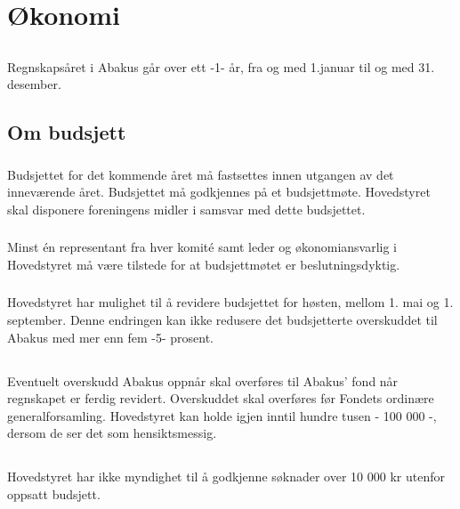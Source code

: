 \section{Økonomi}

\subsection{}
Regnskapsåret i Abakus går over ett -1- år, fra og med 1.januar til og med 31. desember.

\subsection{Om budsjett}
\subsubsection{}
Budsjettet for det kommende året må fastsettes innen utgangen av det inneværende året. Budsjettet må godkjennes på et budsjettmøte. Hovedstyret skal disponere foreningens midler i samsvar med dette budsjettet.

\subsubsection{}
Minst én representant fra hver komité samt leder og økonomiansvarlig i Hovedstyret må være tilstede for at budsjettmøtet er beslutningsdyktig.

\subsubsection{}
Hovedstyret har mulighet til å revidere budsjettet for høsten, mellom 1. mai og 1. september.
Denne endringen kan ikke redusere det budsjetterte overskuddet til Abakus med mer enn fem -5- prosent.

\subsection{}
Eventuelt overskudd Abakus oppnår skal overføres til Abakus’ fond når regnskapet er ferdig revidert.
Overskuddet skal overføres før Fondets ordinære generalforsamling.
Hovedstyret kan holde igjen inntil hundre tusen - 100 000 -, dersom de ser det som hensiktsmessig.

\subsection{}
Hovedstyret har ikke myndighet til å godkjenne søknader over 10 000 kr utenfor
oppsatt budsjett.
